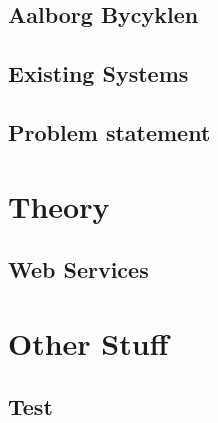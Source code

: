 \section{Aalborg Bycyklen}




\section{Existing Systems}


\section{Problem statement}


\chapter{Theory}

\section{Web Services}




\chapter{Other Stuff}

\section{Test}


\appendix






